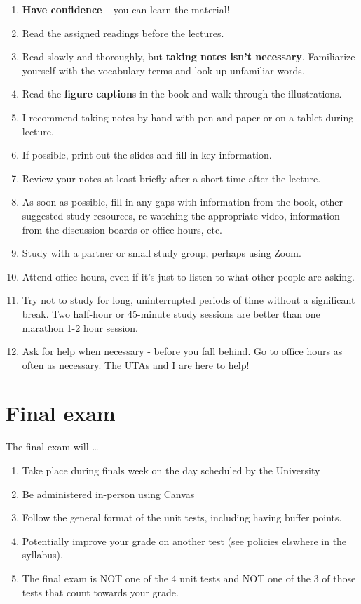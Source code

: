 \documentclass[
]{book}
\providecommand{\tightlist}{%
  \setlength{\itemsep}{0pt}\setlength{\parskip}{0pt}}
\begin{document}
\begin{enumerate}
\def\labelenumi{\arabic{enumi}.}
\tightlist
\item
  \textbf{Have confidence} -- you can learn the material!\\
\item
  Read the assigned readings before the lectures.
\item
  Read slowly and thoroughly, but \textbf{taking notes isn't necessary}. Familiarize yourself with the vocabulary terms and look up unfamiliar words.
\item
  Read the \textbf{figure caption}s in the book and walk through the illustrations.
\item
  I recommend taking notes by hand with pen and paper or on a tablet during lecture.
\item
  If possible, print out the slides and fill in key information.
\item
  Review your notes at least briefly after a short time after the lecture.
\item
  As soon as possible, fill in any gaps with information from the book, other suggested study resources, re-watching the appropriate video, information from the discussion boards or office hours, etc.
\item
  Study with a partner or small study group, perhaps using Zoom.
\item
  Attend office hours, even if it's just to listen to what other people are asking.
\item
  Try not to study for long, uninterrupted periods of time without a significant break.
  Two half-hour or 45-minute study sessions are better than one marathon 1-2 hour session.
\item
  Ask for help when necessary - before you fall behind. Go to office hours as often as necessary. The UTAs and I are here to help!
\end{enumerate}

\hypertarget{final-exam}{%
\chapter{Final exam}\label{final-exam}}

The final exam will \ldots{}

\begin{enumerate}
\def\labelenumi{\arabic{enumi}.}
\tightlist
\item
  Take place during finals week on the day scheduled by the University
\item
  Be administered in-person using Canvas
\item
  Follow the general format of the unit tests, including having buffer points.
\item
  Potentially improve your grade on another test (see policies elswhere in the syllabus).
\item
  The final exam is NOT one of the 4 unit tests and NOT one of the 3 of those tests that count towards your grade.
\end{enumerate}
\end{document}
